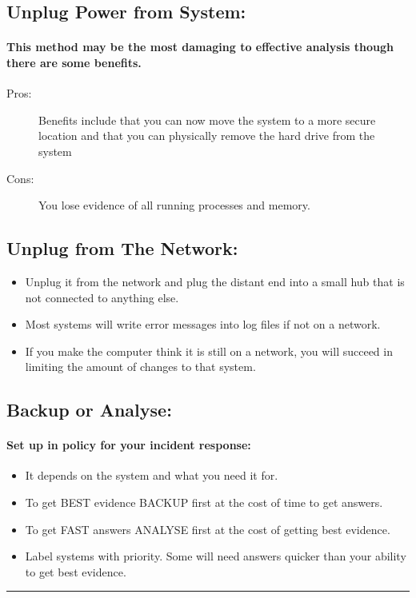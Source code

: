 \documentclass[british]{article}
\begin{document}
\subsection{Unplug Power from System:}

\paragraph{This method may be the most damaging to effective analysis though
	there are some benefits.}
\begin{description}
	\item [{Pros:}] Benefits include that you can now move the system to a
	      more secure location and that you can physically remove the hard drive
	      from the system
	\item [{Cons:}] You lose evidence of all running processes and memory.
\end{description}

\subsection{Unplug from The Network:}
\begin{itemize}
	\item Unplug it from the network and plug the distant end into a small hub
	      that is not connected to anything else.
	\item Most systems will write error messages into log files if not on a
	      network.
	\item If you make the computer think it is still on a network, you will
	      succeed in limiting the amount of changes to that system.
\end{itemize}

\subsection{Backup or Analyse:}

\paragraph{Set up in policy for your incident response:}
\begin{itemize}
	\item It depends on the system and what you need it for.
	\item To get BEST evidence BACKUP first at the cost of time to get answers.
	\item To get FAST answers ANALYSE first at the cost of getting best evidence.
	\item Label systems with priority. Some will need answers quicker than your
	      ability to get best evidence.
\end{itemize}
\rule[0.5ex]{0.75\columnwidth}{1pt}
\end{document}
